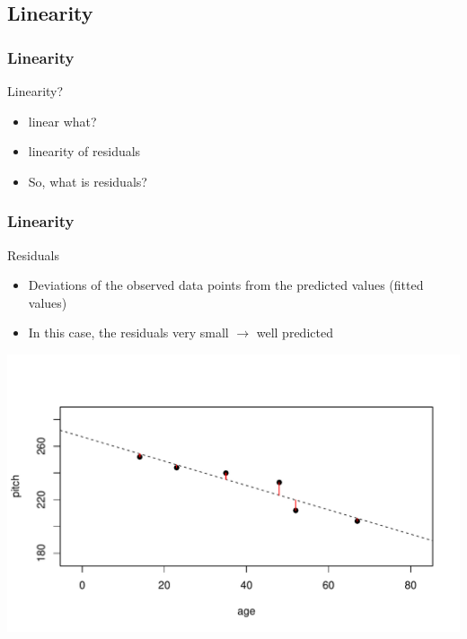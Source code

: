 \documentclass{beamer}\usepackage[]{graphicx}\usepackage[]{color}
\makeatletter
\def\maxwidth{ %
  \ifdim\Gin@nat@width>\linewidth
    \linewidth
  \else
    \Gin@nat@width
  \fi
}
\newenvironment{knitrout}{}{} %
\makeatother
\begin{document}
\subsection{Linearity}
\begin{frame}
\frametitle{Linearity}
Linearity?
\begin{itemize}
\item linear what?
\pause
\item linearity of residuals
\pause
\item So, what is residuals?
\end{itemize}
\end{frame}

\begin{frame}[fragile]
\frametitle{Linearity}
Residuals
\begin{itemize}
\item Deviations of the observed data points from the predicted values (fitted values)
\item In this case, the residuals very small $\rightarrow$ well predicted
\end{itemize}

\begin{knitrout}
\color{fgcolor}
\includegraphics[width=\maxwidth]{figure/unnamed-chunk-15-1} 

\end{knitrout}
\end{frame}
\end{document}
